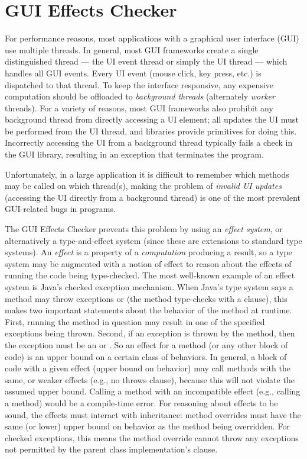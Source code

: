 \htmlhr
\chapter{GUI Effects Checker\label{guieffects-checker}}

For performance reasons, most applications with a graphical user interface (GUI) use multiple
threads.  In general, most GUI frameworks create a single distinguished thread --- the UI event thread
or simply the UI thread --- which handles all GUI events.  Every UI event (mouse click, key press,
etc.) is dispatched to that thread.  To keep the interface responsive, any expensive computation should be
offloaded to \emph{background threads} (alternately \emph{worker} threads).  For a variety of
reasons, most GUI frameworks also prohibit any background thread from directly accessing a UI
element; all updates the UI must be performed from the UI thread, and libraries provide primitives
for doing this.  Incorrectly accessing the UI from a background thread typically fails a check in
the GUI library, resulting in an exception that terminates the program.

Unfortunately, in a large application it is difficult to remember which methods may be called on
which thread(s), making the problem of \emph{invalid UI updates} (accessing the UI directly from a
background thread) is one of the most prevalent GUI-related bugs in programs.

The GUI Effects Checker prevents this problem by using an \emph{effect system}, or alternatively a type-and-effect system
(since these are extensions to standard type systems).
An \emph{effect} is a property of a \emph{computation} producing a result,
so a type system may be augmented with a notion of effect to reason about the effects of running the
code being type-checked.  
The most well-known example of an effect system is Java's checked exception mechanism.  When Java's
type system says a method may throw exceptions  or  (the method type-checks with a
 clause), this makes two important statements about the behavior of the method at
runtime.  First, running the method in question may result in one of the specified exceptions being
thrown.  Second, if an exception is thrown by the method, then the exception must be an  or
.  So an effect for a method (or any other block of code) is an upper bound on a certain
class of behaviors.  In general, a block of code with a given effect (upper bound on behavior) may
call methods with the same, or weaker effects (e.g., no throws clause), because this will not
violate the assumed upper bound.  Calling a method with an incompatible effect (e.g., calling a
 method) would be a compile-time error.  For reasoning about effects to be sound, the
effects must interact with inheritance: method overrides must have the same (or lower) upper bound
on behavior as the method being overridden.  For checked exceptions, this means the method override
cannot throw any exceptions not permitted by the parent class implementation's  clause.

